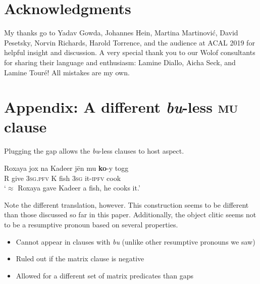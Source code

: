 \documentclass[output=paper]{langscibook}
\begin{document}
\section*{Acknowledgments}

My thanks go to Yadav Gowda, Johannes Hein, Martina Martinovi\'c, David Pesetsky, Norvin Richards, Harold Torrence, and the audience at ACAL 2019 for helpful insight and discussion. A very special thank you to our Wolof consultants for sharing their language and enthusiasm: Lamine Diallo, Aicha Seck, and Lamine Tour\'e! All mistakes are my own.



\section*{Appendix: A different \emph{bu}-less \textsc{mu} clause}

Plugging the gap allows the \emph{bu}-less clauses to host aspect.

\begin{exe}
	\ex 
	\gll Roxaya jox na Kadeer j\"en mu \textbf{ko}-y togg \\
	R give \textsc{3sg.pfv} K fish \textsc{3sg} it\textsc{-ipfv} cook \\
	\trans `$\approx$ Roxaya gave Kadeer a fish, he cooks it.'
\end{exe}

Note the different translation, however. This construction seems to be different than those discussed so far in this paper. Additionally, the object clitic seems not to be a resumptive pronoun based on several properties.

\begin{itemize}
	\item Cannot appear in clauses with \emph{bu} (unlike other resumptive pronouns we saw)
	\item Ruled out if the matrix clause is negative
	\item Allowed for a different set of matrix predicates than gaps
\end{itemize}
\end{document}
